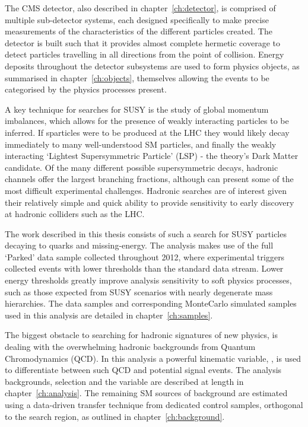 The CMS detector, also described in chapter~\ref{ch:detector}, is comprised of
multiple sub-detector systems, each designed
specifically to make precise measurements of the characteristics of the
different particles created. The detector is built such that it provides almost
complete hermetic coverage to detect particles travelling in all directions
from the point of collision. Energy deposits throughout the detector subsystems
are used to form physics objects, as summarised in
chapter~\ref{ch:objects}, themselves allowing the events to be categorised by
the physics processes present.

A key technique
for searches for SUSY is the study of global momentum imbalances,
which allows for the presence of weakly interacting particles to be inferred.
If sparticles were to be produced at the LHC they would likely decay immediately
to many well-understood SM particles, and finally the weakly interacting
`Lightest Supersymmetric Particle' (LSP) - the theory's Dark Matter candidate.
Of the many different possible supersymmetric decays, hadronic channels offer
the largest branching fractions, although can present some of the most
difficult experimental challenges. Hadronic searches are of interest given their
relatively simple and quick ability to provide sensitivity to early discovery at
hadronic colliders such as the LHC.

The work described in this thesis consists of such a search for SUSY particles
decaying to quarks and missing-energy. The analysis makes use of the full
`Parked' data sample collected throughout 2012, where experimental
triggers collected events with lower thresholds than the standard data stream.
Lower energy thresholds greatly improve analysis sensitivity to soft physics
processes, such as those expected from SUSY scenarios with nearly degenerate
mass hierarchies. The data samples and corresponding MonteCarlo simulated
samples used in this analysis are detailed in chapter~\ref{ch:samples}.

The biggest obstacle to
searching for hadronic signatures of new physics, is dealing with the
overwhelming hadronic backgrounds from Quantum Chromodynamics (QCD). In this
analysis a powerful kinematic variable, \alphat, is used to differentiate
between such QCD and potential signal events. The analysis backgrounds,
selection and
the \alphat variable are described at length in chapter~\ref{ch:analysis}. The
remaining SM sources of background
are estimated using a data-driven transfer technique from dedicated control
samples, orthogonal to the search region, as outlined in
chapter~\ref{ch:background}.

